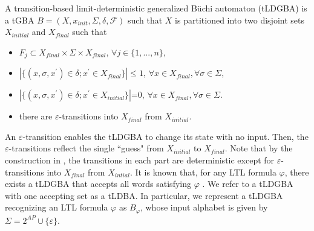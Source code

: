 \begin{definition}
  A transition-based limit-deterministic generalized B\"{u}chi automaton (tLDGBA) is a tGBA $B = (X, x_{init},\Sigma,\delta,\mathcal{F})$ such that $X$ is partitioned into two disjoint sets $X_{initial}$ and $X_{final}$ such that
  \begin{itemize}
    \item $F_j \subset X_{final} \times \Sigma \times X_{final}$, $\forall j \in \{ 1,...,n \}$,
    \item $| \{ (x, \sigma, x^{\prime}) \in \delta; x^{\prime} \in X_{final} \} | \! \leq \! 1$, $\forall x \! \in \! X_{final}, \forall \sigma \! \in \! \Sigma$,
    \item $| \{ (x, \sigma, x^{\prime}) \in \delta; x^{\prime} \in X_{initial} \} |$=0, $\forall x \! \in \! X_{final}, \forall \sigma \! \in \! \Sigma$.
    \item there are $\varepsilon$-transitions into $X_{final}$ from $X_{initial}$.
\end{itemize}
\end{definition}
  An $\varepsilon$-transition enables the tLDGBA to change its state with no input. Then, the $\varepsilon$-transitions reflect the single ``guess" from $X_{initial}$ to $X_{final}$. Note that by the construction in \cite{SEJK2016}, the transitions in each part are deterministic except for $\varepsilon$-transitions into $X_{final}$ from $X_{intial}$.
It is known that, for any LTL formula $ \varphi $, there exists a tLDGBA that accepts all words satisfying $\varphi$ \cite{SEJK2016}. We refer to a tLDGBA with one accepting set as a tLDBA.
In particular, we represent a tLDGBA recognizing an LTL formula $\varphi$ as $B_{\varphi}$, whose input alphabet is given by $ \Sigma = 2^{AP} \cup \{ \varepsilon \} $.
